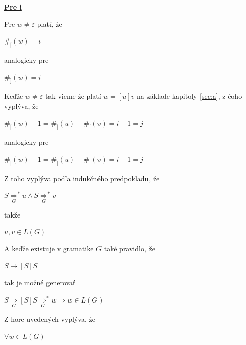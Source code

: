 \documentclass[11pt,a4paper]{article}
\begin{document}
\newpage
\underline{\textbf{Pre i}}
\begin{flushright}
\begin{minipage}{0.95\textwidth}

    Pre $w \neq \varepsilon$ platí, že

    \begin{center}
        $\#_[(w) = i$
    \end{center}

    analogicky pre

    \begin{center}
        $\#_](w) = i$
    \end{center}

    Keďže $w \neq \varepsilon$ tak vieme že platí $w=[u]v$ na základe kapitoly \ref{sec:a}, z čoho vyplýva, že

    \begin{center}
    $\#_[(w) - 1 = \#_[(u) + \#_[(v) = i-1 = j$
    \end{center}

    analogicky pre

    \begin{center}
    $\#_](w) - 1 = \#_](u) + \#_](v) = i-1 = j$
    \end{center}

    Z toho vyplýva podľa indukčného predpokladu, že

    \begin{center}
    $S {\underset{G}{\Rightarrow}}^* u \wedge S {\underset{G}{\Rightarrow}}^* v$
    \end{center}

    takže

    \begin{center}
    $u,v \in L(G)$
    \end{center}

    A keďže existuje v gramatike $G$ také pravidlo, že

    \begin{center}
        $S \rightarrow [S]S$
    \end{center}

    tak je možné generovať
    \begin{center}
        $S {\underset{G}{\Rightarrow}} [S]S {\underset{G}{\Rightarrow}}^* w \Rightarrow w \in L(G)$
    \end{center}

    Z hore uvedených vyplýva, že
    \begin{center}
        $\forall w \in L(G)$
    \end{center}

\end{minipage}
\end{flushright}
\end{document}
